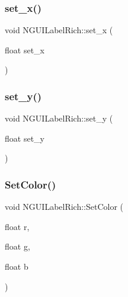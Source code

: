 \subsubsection{\texorpdfstring{set\+\_\+x()}{set\_x()}}
{\footnotesize\ttfamily void N\+G\+U\+I\+Label\+Rich\+::set\+\_\+x (\begin{DoxyParamCaption}\item[{float}]{set\+\_\+x }\end{DoxyParamCaption})}

\hypertarget{class_n_g_u_i_label_rich_a3d41588eae4e62650336dceeb9413cfe}{}\label{class_n_g_u_i_label_rich_a3d41588eae4e62650336dceeb9413cfe} 
\subsubsection{\texorpdfstring{set\+\_\+y()}{set\_y()}}
{\footnotesize\ttfamily void N\+G\+U\+I\+Label\+Rich\+::set\+\_\+y (\begin{DoxyParamCaption}\item[{float}]{set\+\_\+y }\end{DoxyParamCaption})}

\hypertarget{class_n_g_u_i_label_rich_a326a7fa95ac1f0d58b8176ee151e41ba}{}\label{class_n_g_u_i_label_rich_a326a7fa95ac1f0d58b8176ee151e41ba} 
\subsubsection{\texorpdfstring{Set\+Color()}{SetColor()}\hspace{0.1cm}{\footnotesize\ttfamily [1/2]}}
{\footnotesize\ttfamily void N\+G\+U\+I\+Label\+Rich\+::\+Set\+Color (\begin{DoxyParamCaption}\item[{float}]{r,  }\item[{float}]{g,  }\item[{float}]{b }\end{DoxyParamCaption})}

\hypertarget{class_n_g_u_i_label_rich_a1619f5a152ba7debff53d618e23e16c1}{}\label{class_n_g_u_i_label_rich_a1619f5a152ba7debff53d618e23e16c1} 
